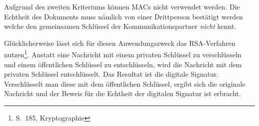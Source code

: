 Aufgrund des zweiten Kriteriums können \ac{MAC}s nicht verwendet
werden.  Die Echtheit des Dokuments muss nämlich von einer Drittperson
bestätigt werden welche den gemeinsamen Schlüssel der
Kommunikationspartner \emph{nicht} kennt.

Glücklicherweise lässt sich für diesen Anwendungszweck das
\ac{RSA}-Verfahren nutzen\footnote{S.~185, Kryptographie}.  Anstatt
eine Nachricht mit einem privaten Schlüssel zu verschlüsseln und einem
öffentlichen Schlüssel zu entschlüsseln, wird die Nachricht mit dem
privaten Schlüssel entschlüsselt.  Das Resultat ist die digitale
Signatur.  Verschlüsselt man diese mit dem öffentlichen Schlüssel,
ergibt sich die originale Nachricht und der Beweis für die Echtheit
der digitalen Signatur ist erbracht.
